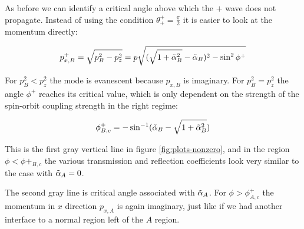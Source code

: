 As before we can identify a critical angle above which the $+$ wave
does not propagate. Instead of using the condition $\theta^+_+ =
\frac{\pi}{2}$ it is easier to look at the momentum directly:

\begin{align}
    p_{x,B}^+ = \sqrt{ p_B^2 - p_z^2} = p \sqrt{(\sqrt{1+\tilde \alpha_B^2} -
            \tilde \alpha_B)^2 - \sin^2 \phi^+}
\end{align}

For $p_B^2 < p_z^2$ the mode is evanescent because $p_{x,B}$ is
imaginary. For $p_B^2 = p_z^2$ the angle $\phi^+$ reaches its critical
value, which is only dependent on the strength of the spin-orbit
coupling strength in the right regime:

\begin{align}
    \phi^+_{B,c} = -\sin^{-1}(\tilde \alpha_B - \sqrt{1+\tilde \alpha_B^2})
\end{align}

This is the first gray vertical line in figure
\ref{fig:plots-nonzero}, and in the region $\phi < \phi+_{B,c}$ the various transmission and reflection
coefficients look very similar to the case with $\tilde \alpha_A = 0$.

The second gray line is critical angle associated with $\tilde \alpha_A$. For
$\phi > \phi^+_{A,c}$ the momentum in $x$ direction $p_{x,A}$ is again
imaginary, just like if we had another interface to a normal region
left of the $A$ region.

%
%

